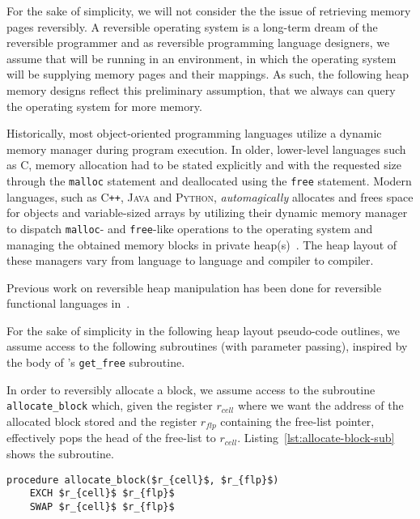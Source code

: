 For the sake of simplicity, we will not consider the the issue of retrieving memory pages reversibly. A reversible operating system is a long-term dream of the reversible programmer and as reversible programming language designers, we assume that \rooplpp will be running in an environment, in which the operating system will be supplying memory pages and their mappings. As such, the following heap memory designs reflect this preliminary assumption, that we always can query the operating system for more memory. 

Historically, most object-oriented programming languages utilize a dynamic memory manager during program execution. In older, lower-level languages such as \textsc{C}, memory allocation had to be stated explicitly and with the requested size through the \texttt{malloc} statement and deallocated using the \texttt{free} statement. Modern languages, such as \textsc{C\texttt{++}}, \textsc{Java} and \textsc{Python}, \textit{automagically} allocates and frees space for objects and variable-sized arrays by utilizing their dynamic memory manager to dispatch \texttt{malloc}- and \texttt{free}-like operations to the operating system and managing the obtained memory blocks in private heap(s)~\cite{wh:cpp_memory, bv:jvm, py:memory}. The heap layout of these managers vary from language to language and compiler to compiler.

Previous work on reversible heap manipulation has been done for reversible functional languages in~\cite{ha:heap, jsk:translation, tm:garbage}.




For the sake of simplicity in the following heap layout pseudo-code outlines, we assume access to the following subroutines (with parameter passing), inspired by the body of \citeauthor{ha:heap}'s \texttt{get\_free} subroutine.

In order to reversibly allocate a block, we assume access to the subroutine \texttt{allocate\_block} which, given the register $r_{cell}$ where we want the address of the allocated block stored and the register $r_{flp}$ containing the free-list pointer, effectively pops the head of the free-list to  $r_{cell}$. Listing~\ref{lst:allocate-block-sub} shows the subroutine.

\begin{lstlisting}[caption={\texttt{allocate\_block} subroutine}, language=janus, style=basic,label={lst:allocate-block-sub}]
procedure allocate_block($r_{cell}$, $r_{flp}$)
	EXCH $r_{cell}$ $r_{flp}$
	SWAP $r_{cell}$ $r_{flp}$
\end{lstlisting}

